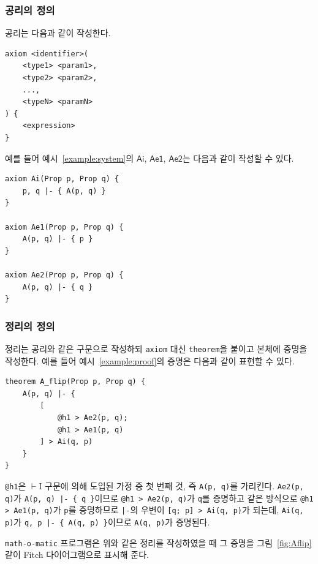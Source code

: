 \documentclass[10pt,twocolumn]{article}
\theoremstyle{definition}
\begin{document}
\subsubsection{공리의 정의}

공리는 다음과 같이 작성한다.
\begin{lstlisting}
axiom <identifier>(
	<type1> <param1>,
	<type2> <param2>,
	...,
	<typeN> <paramN>
) {
	<expression>	
}
\end{lstlisting}
예를 들어 예시~\ref{example:system}의 $\mathsf{Ai}$, $\mathsf{Ae1}$, $\mathsf{Ae2}$는 다음과 같이 작성할 수 있다.
\begin{lstlisting}
axiom Ai(Prop p, Prop q) {
	p, q |- { A(p, q) }
}

axiom Ae1(Prop p, Prop q) {
	A(p, q) |- { p }
}

axiom Ae2(Prop p, Prop q) {
	A(p, q) |- { q }
}
\end{lstlisting}

\subsubsection{정리의 정의}

정리는 공리와 같은 구문으로 작성하되 \verb!axiom! 대신 \verb!theorem!을 붙이고 본체에 증명을 작성한다. 예를 들어 예시~\ref{example:proof}의 증명은 다음과 같이 표현할 수 있다.
\begin{lstlisting}
theorem A_flip(Prop p, Prop q) {
	A(p, q) |- {
		[
			@h1 > Ae2(p, q);
			@h1 > Ae1(p, q)
		] > Ai(q, p)
	}	
}
\end{lstlisting}
\verb!@h1!은 $\vdash$I 구문에 의해 도입된 가정 중 첫 번째 것, 즉 \verb!A(p, q)!를 가리킨다. \texttt{Ae2(p, q)}가 \verb!A(p, q) |- { q }!이므로 \texttt{@h1 > Ae2(p, q)}가 \verb!q!를 증명하고 같은 방식으로 \texttt{@h1 > Ae1(p, q)}가 \verb!p!를 증명하므로 \verb!|-!의 우변이 \texttt{[q; p] > Ai(q, p)}가 되는데, \texttt{Ai(q, p)}가 \verb!q, p |- { A(q, p) }!이므로 \verb!A(q, p)!가 증명된다.

\texttt{math-o-matic} 프로그램은 위와 같은 정리를 작성하였을 때 그 증명을 그림~\ref{fig:Aflip}\과 같이 Fitch 다이어그램으로 표시해 준다.
\end{document}
